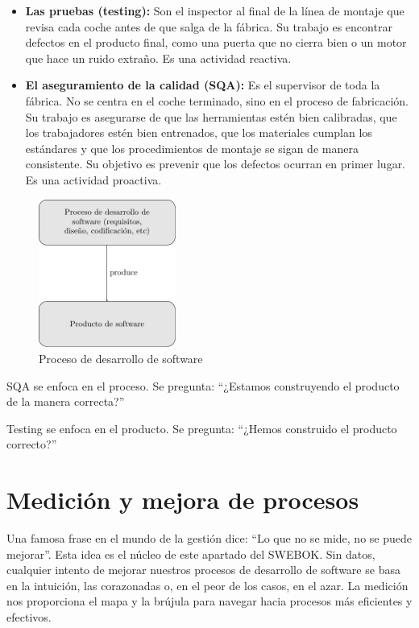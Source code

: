 \begin{itemize}
  \item \textbf{Las pruebas (testing):} Son el inspector al final de la línea de montaje que revisa cada coche antes de que salga de la fábrica. 
  Su trabajo es encontrar defectos en el producto final, como una puerta que no cierra bien o un motor que hace un ruido extraño. 
  Es una actividad reactiva.
  \item \textbf{El aseguramiento de la calidad (SQA):} Es el supervisor de toda la fábrica. 
  No se centra en el coche terminado, sino en el proceso de fabricación. 
  Su trabajo es asegurarse de que las herramientas estén bien calibradas, que los trabajadores estén bien entrenados, que los materiales cumplan los estándares y que los procedimientos de montaje se sigan de manera consistente. 
  Su objetivo es prevenir que los defectos ocurran en primer lugar. 
  Es una actividad proactiva.
\end{itemize}
\begin{figure}[H]
    \centering
    \caption{Proceso de desarrollo de software}
    \label{fig:proceso_software}
    \includegraphics[width=0.4\textwidth]{image/cap2_img1.pdf}
\end{figure}
SQA se enfoca en el proceso. Se pregunta: ``¿Estamos construyendo el producto de la manera correcta?''

Testing se enfoca en el producto. Se pregunta: ``¿Hemos construido el producto correcto?''

\section{Medición y mejora de procesos}
Una famosa frase en el mundo de la gestión dice: 
``Lo que no se mide, no se puede mejorar''. 
Esta idea es el núcleo de este apartado del SWEBOK. 
Sin datos, cualquier intento de mejorar nuestros procesos de desarrollo de software se basa en la intuición, las corazonadas o, en el peor de los casos, en el azar. 
La medición nos proporciona el mapa y la brújula para navegar hacia procesos más eficientes y efectivos.

